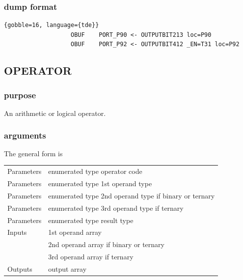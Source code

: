             \subsubsection{dump format}
            
                \begin{lstlisting}{gobble=16, language={tde}}
                   OBUF    PORT_P90 <- OUTPUTBIT213 loc=P90
                   OBUF    PORT_P92 <- OUTPUTBIT412 _EN=T31 loc=P92
                \end{lstlisting}


        \subsection{OPERATOR}

            \subsubsection{purpose}
            
                An arithmetic or logical operator.

            \subsubsection{arguments}
            
                The general form is

                \begin{tabular}{| l | l |}
                \hline
                Parameters  & enumerated type operator code \\
                Parameters  & enumerated type 1st operand type \\
                Parameters  & enumerated type 2nd operand type if binary or ternary \\
                Parameters  & enumerated type 3rd operand type if ternary \\
                Parameters  & enumerated type result type \\
                \hline
                Inputs      & 1st operand array \\
                            & 2nd operand array if binary or ternary \\
                            & 3rd operand array if ternary \\
                \hline
                Outputs     & output array \\
                \hline
                \end{tabular}

